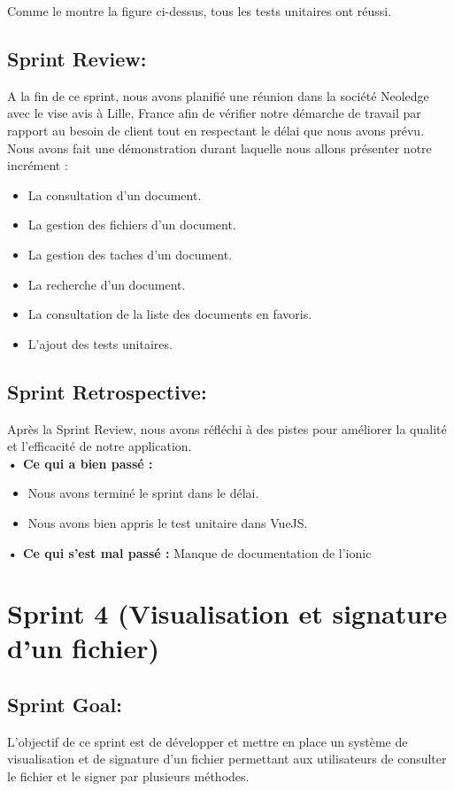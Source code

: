 Comme le montre la figure ci-dessus, tous les tests unitaires ont réussi.


\subsection{Sprint Review:}
A la fin de ce sprint, nous avons planifié une réunion dans la société Neoledge avec le vise avis à Lille, France afin de vérifier notre démarche de travail par rapport au besoin de client tout en respectant le délai que nous avons prévu.
Nous avons fait une démonstration durant laquelle nous allons présenter notre incrément :
\begin{itemize}
  \item La consultation d'un document.
  \item La gestion des fichiers d'un document.
  \item La gestion des taches d'un document.
  \item La recherche d'un document.
  \item La consultation de la liste des documents en favoris.
  \item L'ajout des tests unitaires.
\end{itemize}

\subsection{Sprint Retrospective:}

Après la Sprint Review, nous avons réfléchi à des pistes pour améliorer la qualité et l'efficacité de notre application.\\
\noindent\textbf{•	Ce qui a bien passé :}
\begin{itemize}
  \item Nous avons terminé le sprint dans le délai.
  \item Nous avons bien appris le test unitaire dans VueJS.
\end{itemize}
\noindent\textbf{•	Ce qui s'est mal passé :}
Manque de documentation de l'ionic 


\section{Sprint 4 (Visualisation et signature d'un fichier)}
\subsection{Sprint Goal:}
L'objectif de ce sprint est de développer et mettre en place un système de visualisation et de signature d'un fichier permettant aux utilisateurs de consulter le fichier et le signer par plusieurs méthodes.


